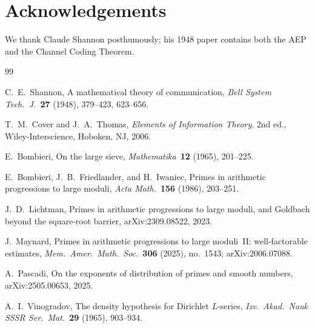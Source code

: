 \documentclass[12pt]{amsart}
\theoremstyle{plain}
\theoremstyle{definition}
\theoremstyle{remark}
\begin{document}
\section*{Acknowledgements}

We thank Claude Shannon posthumously; his 1948 paper contains both the AEP and
the Channel Coding Theorem.

\begin{thebibliography}{99}


C.~E.~Shannon,
A mathematical theory of communication,
\emph{Bell System Tech.\ J.}\ \textbf{27} (1948), 379--423, 623--656.

T.~M.~Cover and J.~A.~Thomas,
\emph{Elements of Information Theory},
2nd ed., Wiley-Interscience, Hoboken, NJ, 2006.


E.~Bombieri,
On the large sieve,
\emph{Mathematika}\ \textbf{12} (1965), 201--225.

E.~Bombieri, J.~B.~Friedlander, and H.~Iwaniec,
Primes in arithmetic progressions to large moduli,
\emph{Acta Math.}\ \textbf{156} (1986), 203--251.

J.~D.~Lichtman,
Primes in arithmetic progressions to large moduli, and Goldbach beyond the
square-root barrier,
arXiv:2309.08522, 2023.

J.~Maynard,
Primes in arithmetic progressions to large moduli~II: well-factorable
estimates,
\emph{Mem.\ Amer.\ Math.\ Soc.}\ \textbf{306} (2025), no.~1543;
arXiv:2006.07088.

A.~Pascadi,
On the exponents of distribution of primes and smooth numbers,
arXiv:2505.00653, 2025.

A.~I.~Vinogradov,
The density hypothesis for Dirichlet $L$-series,
\emph{Izv.\ Akad.\ Nauk SSSR Ser.\ Mat.}\ \textbf{29} (1965), 903--934.



\end{thebibliography}
\end{document}
